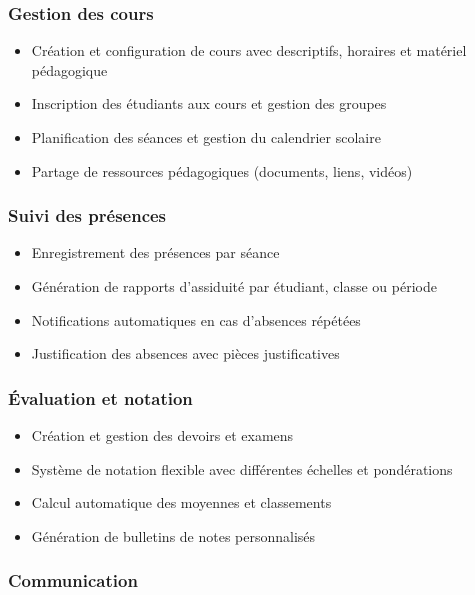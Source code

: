 \subsubsection{Gestion des cours}

\begin{itemize}
  \item Création et configuration de cours avec descriptifs, horaires et matériel pédagogique
  \item Inscription des étudiants aux cours et gestion des groupes
  \item Planification des séances et gestion du calendrier scolaire
  \item Partage de ressources pédagogiques (documents, liens, vidéos)
\end{itemize}

\subsubsection{Suivi des présences}

\begin{itemize}
  \item Enregistrement des présences par séance
  \item Génération de rapports d'assiduité par étudiant, classe ou période
  \item Notifications automatiques en cas d'absences répétées
  \item Justification des absences avec pièces justificatives
\end{itemize}

\subsubsection{Évaluation et notation}

\begin{itemize}
  \item Création et gestion des devoirs et examens
  \item Système de notation flexible avec différentes échelles et pondérations
  \item Calcul automatique des moyennes et classements
  \item Génération de bulletins de notes personnalisés
\end{itemize}

\subsubsection{Communication}

